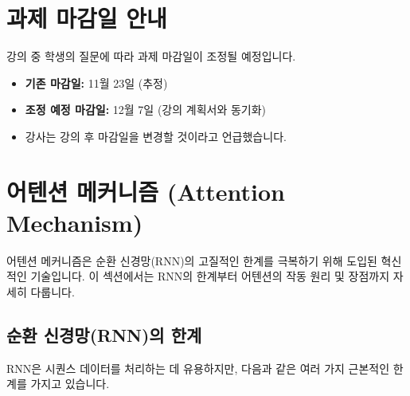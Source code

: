 \documentclass[11pt,a4paper]{article}
\theoremstyle{definition}
\begin{document}
\newpage
\section{과제 마감일 안내}
강의 중 학생의 질문에 따라 과제 마감일이 조정될 예정입니다.

\begin{tcolorbox}[summary, title={과제 10 마감일 조정}]
\begin{itemize}
    \item \textbf{기존 마감일:} 11월 23일 (추정)
    \item \textbf{조정 예정 마감일:} 12월 7일 (강의 계획서와 동기화)
    \item 강사는 강의 후 마감일을 변경할 것이라고 언급했습니다.
\end{itemize}
\end{tcolorbox}

\newpage
\section{어텐션 메커니즘 (Attention Mechanism)}
어텐션 메커니즘은 순환 신경망(RNN)의 고질적인 한계를 극복하기 위해 도입된 혁신적인 기술입니다. 이 섹션에서는 RNN의 한계부터 어텐션의 작동 원리 및 장점까지 자세히 다룹니다.

\subsection{순환 신경망(RNN)의 한계}
RNN은 시퀀스 데이터를 처리하는 데 유용하지만, 다음과 같은 여러 가지 근본적인 한계를 가지고 있습니다.
\end{document}
